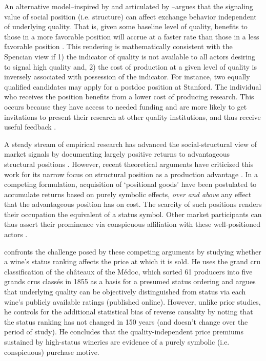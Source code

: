 An alternative model--inspired by \citet{merton1968} and articulated by \citet{podolny1993, podolny2005}--argues that the signaling value of social position (i.e. structure) can affect exchange behavior independent of underlying quality. That is, given some baseline level of quality, benefits to those in a more favorable position will accrue at a faster rate than those in a less favorable position \citep{lynn2009}. This rendering is mathematically consistent with the Spencian view if 1) the indicator of quality is not available to all actors desiring to signal high quality and, 2) the cost of production at a given level of quality is inversely associated with possession of the indicator. For instance, two equally qualified candidates may apply for a postdoc position at Stanford. The individual who receives the position benefits from a lower cost of producing research. This occurs because they have access to needed funding and are more likely to get invitations to present their research at other quality institutions, and thus receive useful feedback \citep{podolny2005}.

A steady stream of empirical research has advanced the social-structural view of market signals by documenting largely positive returns to advantageous structural positions \citep{benjamin1999, bothner2014, kim2014, podolny1993, powell1996}. However, recent theoretical arguments have criticized this work for its narrow focus on structural position as a production advantage \citep{washington2005, jensen2011}. In a competing formulation, acquisition of `positional goods' \citep[e.g.][]{hirsch1977} have been postulated to accumulate returns based on purely symbolic effects, {\it over and above} any effect that the advantageous position has on cost. The scarcity of such positions renders their occupation the equivalent of a status symbol. Other market participants can thus assert their prominence via conspicuous affiliation with these well-positioned actors \citep{bourdieu1984, veblen1899}. 

\citet{malter2014} confronts the challenge posed by these competing arguments by studying whether a wine's status ranking affects the price at which it is sold. He uses the grand cru classification of the ch\^ateaux of the M\'edoc, which sorted 61 producers into five grands crus class\'es in 1855 as a basis for a presumed status ordering and argues that underlying quality can be objectively distinguished from status via each wine's publicly available ratings (published online). However, unlike prior studies, he controls for the additional statistical bias of reverse causality by noting that the status ranking has not changed in 150 years (and doesn't change over the period of study). He concludes that the quality-independent price premiums sustained by high-status wineries are evidence of a purely symbolic (i.e. conspicuous) purchase motive.

